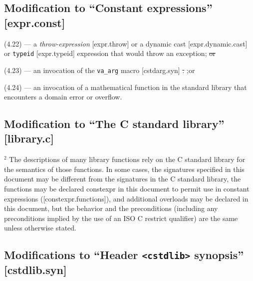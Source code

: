 \documentclass[prd,twocolumn,amsmath,amssymb,nofootinbib,eqsecnum]{revtex4-1}
\newcommand{\code}[1]{{\tt #1}}
\newcommand{\header}[1]{{\tt <#1>}}
\newcommand{\highlight}[1]{{\color{green} #1}}
\newcommand{\remove}[1]{{\color{red} #1}}
\begin{document}
\subsection{Modification to ``Constant expressions'' [expr.const]}


{\small (4.22)} --- a \emph{throw-expression} [expr.throw] or a dynamic cast [expr.dynamic.cast] or \code{typeid} [expr.typeid] expression that would throw an exception; \remove{\st{or}}

{\small (4.23)} --- an invocation of the \code{va\_arg} macro [cstdarg.syn]\remove{\st{.}}\highlight{;or}

\highlight{{{\small (4.24)}} --- an invocation of a mathematical function in the standard library that encounters a domain error or overflow.}

\subsection{Modification to ``The C standard library'' [library.c]}

\hspace{-2.5ex} $^2$ The descriptions of many library functions rely on the C standard library for the semantics of those functions.
In some cases, the signatures specified in this document may be different from the signatures in the C
standard library, 
\highlight{the functions may be declared constexpr in this document to permit use in constant expressions ([constexpr.functions]),}
and additional overloads may be declared in this document, but the behavior and the
preconditions (including any preconditions implied by the use of an ISO C restrict qualifier) are the same
unless otherwise stated.


\subsection{Modifications to ``Header \header{cstdlib} synopsis'' [cstdlib.syn]}
\end{document}
